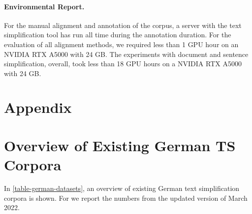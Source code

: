 \documentclass[11pt]{article}
\begin{document}
\paragraph{Environmental Report.}
For the manual alignment and annotation of the corpus, a server with the text simplification tool has run all time during the annotation duration. 
 For the evaluation of all alignment methods, we required less than 1 GPU hour on an NVIDIA RTX A5000 with 24 GB. The experiments with document and sentence simplification, overall, took less than 18 GPU hours on a NVIDIA RTX A5000 with 24 GB.





\appendix
\newpage


\section*{Appendix}
\label{sec:appendix}

\section{Overview of Existing German TS Corpora}
\label{appendix-overview-corpora}
In \autoref{table-german-datasets}, an overview of existing German text simplification corpora is shown. For \citet{hewett-stede-2021-automatically}  we report the numbers from the updated version of March 2022.
\end{document}
